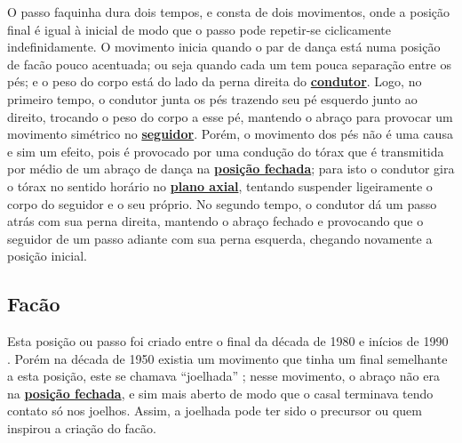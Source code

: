 O passo faquinha dura dois tempos, e consta de dois movimentos, 
onde a posição final é igual à inicial de modo que o passo pode repetir-se ciclicamente indefinidamente.
O movimento inicia quando o par de dança está numa posição de facão pouco acentuada;
ou seja quando cada um tem pouca separação entre os pés; 
e o peso do corpo está do lado da perna direita do \hyperref[def:Condutor]{\textbf{condutor}}.
Logo, no primeiro tempo, 
o condutor junta os pés trazendo seu pé esquerdo junto ao direito, trocando o peso do corpo a esse pé,
mantendo o abraço para provocar um movimento simétrico no \hyperref[def:Seguidor]{\textbf{seguidor}}.
Porém, o movimento dos pés não é uma causa e sim um efeito,
pois é provocado por uma condução do tórax que é transmitida por médio de um abraço de dança na 
\hyperref[def:closed-position]{\textbf{posição fechada}};
para isto o condutor gira o tórax no sentido horário no \hyperref[def:PlanoAxial]{\textbf{plano axial}},
tentando suspender ligeiramente o corpo do seguidor e o seu próprio.
No segundo tempo, o condutor dá um passo atrás com sua perna direita,
 mantendo o abraço fechado e provocando que o seguidor de um passo adiante com sua perna esquerda,
chegando novamente a posição inicial.


\subsection{Facão}
\label{subsec:desc:passo:facao}

\caracterpostura{\CheckedItem}{\NoCheckedItem}
Esta posição ou passo foi  criado entre o final da década de 1980 e inícios de 1990  \cite[pp. 143]{perna2002samba}.
Porém na década de 1950 existia um movimento que tinha um final semelhante a esta posição, 
este se chamava ``joelhada'' \cite[pp. 160]{fornaciari1950aprender};
nesse movimento, o abraço não era na \hyperref[def:closed-position]{\textbf{posição fechada}},
e sim mais aberto de modo que o casal terminava tendo contato só nos joelhos.
Assim, a joelhada pode ter sido o precursor ou quem inspirou a criação do facão.

